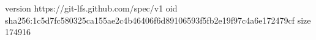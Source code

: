 version https://git-lfs.github.com/spec/v1
oid sha256:1c5d7fc580325ca155ae2c4b46406f6d89106593f5fb2e19f97c4a6e172479cf
size 174916

